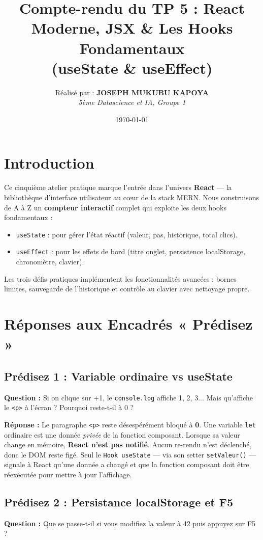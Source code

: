 \documentclass[12pt, a4paper]{article}
\title{\textbf{Compte-rendu du TP 5 : React Moderne, JSX \& Les Hooks Fondamentaux\\(useState \& useEffect)}}
\author{
    Réalisé par : \textbf{JOSEPH MUKUBU KAPOYA} \\
    \textit{5ème Datascience et IA, Groupe 1}
}
\date{\today}
\begin{document}
\maketitle

\section*{Introduction}
Ce cinquième atelier pratique marque l'entrée dans l'univers \textbf{React} — la bibliothèque d'interface utilisateur au cœur de la stack MERN. Nous construisons de A à Z un \textbf{compteur interactif} complet qui exploite les deux hooks fondamentaux :
\begin{itemize}
    \item \texttt{useState} : pour gérer l'état réactif (valeur, pas, historique, total clics).
    \item \texttt{useEffect} : pour les effets de bord (titre onglet, persistence localStorage, chronomètre, clavier).
\end{itemize}
Les trois défis pratiques implémentent les fonctionnalités avancées : bornes limites, sauvegarde de l'historique et contrôle au clavier avec nettoyage propre.

\section{Réponses aux Encadrés « Prédisez »}

\subsection*{Prédisez 1 : Variable ordinaire vs useState}
\textbf{Question :} Si on clique sur +1, le \texttt{console.log} affiche 1, 2, 3... Mais qu'affiche le \texttt{<p>} à l'écran ? Pourquoi reste-t-il à 0 ?

\textbf{Réponse :} Le paragraphe \texttt{<p>} reste désespérément bloqué à \textbf{0}. Une variable \texttt{let} ordinaire est une donnée \textit{privée} de la fonction composant. Lorsque sa valeur change en mémoire, \textbf{React n'est pas notifié}. Aucun re-rendu n'est déclenché, donc le DOM reste figé. Seul le \texttt{Hook useState} — via son setter \texttt{setValeur()} — signale à React qu'une donnée a changé et que la fonction composant doit être réexécutée pour mettre à jour l'affichage.

\subsection*{Prédisez 2 : Persistance localStorage et F5}
\textbf{Question :} Que se passe-t-il si vous modifiez la valeur à 42 puis appuyez sur F5 ?
\end{document}
